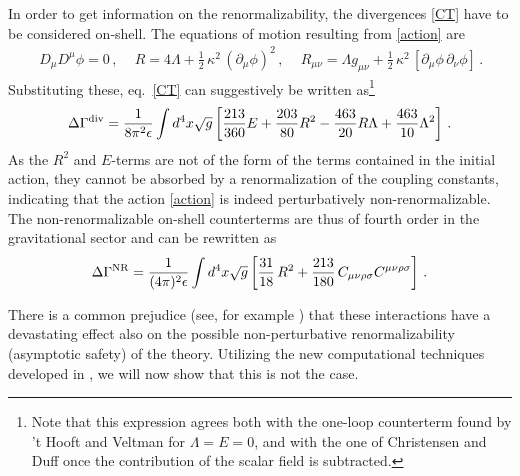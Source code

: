 \documentclass[preprint,preprintnumbers,amsmath,amssymb,nofootinbib,APS]{revtex4}
\newcommand{\be}{\begin{equation}}
\newcommand{\ee}{\end{equation}}
\let\G=\Gamma \let\D=\Delta  \let\Th=\Theta \let\L=\Lambda \let\X=\Xi
\newcommand{\2}{\sqrt{2\,}}
\newcommand{\half}{\tfrac{1}{2}}
\newcommand{\p}{\partial}
\begin{document}
In order to get information on the renormalizability, the divergences \eqref{CT} have to be considered on-shell. 
The equations of motion resulting from \eqref{action} are
%
\be\label{eom}
\begin{split}
 \,D_\mu D^\mu \phi  = 0 \, , \quad
 \,R  = 4 \Lambda + \half \,\kappa^2 \,(\p_\mu \phi)^2 \, , \quad
 \,R_{\mu \nu}  = \Lambda g_{\mu\nu} + \half \,\kappa^2 \, \left[ \p_\mu \phi \, \p_\nu \phi \right] \, .
\end{split}
\ee
%
Substituting these, eq.\ \eqref{CT} can suggestively be written as\footnote{Note that this expression agrees both with the one-loop counterterm found by 't Hooft and Veltman \cite{'tHooft:1974bx} for $\L=E=0$, and with the one of Christensen and Duff \cite{Christensen:1979iy}
once the contribution of the scalar field is subtracted.}
%
\be\label{OSC}
\Delta\G^{\rm div} = \frac{1}{8 \pi^2 \eps} \int d^4x \sqrt{g} \left[ \frac{213}{360} E +\frac{203}{80} R^2-\frac{463}{20} R \Lambda +\frac{463}{10}\Lambda^2 \right] \, .
\ee
%
% 
As the $R^2$ and $E$-terms are not of the form of the terms contained in the initial action, they cannot be absorbed by a renormalization of the coupling constants, indicating that the action \eqref{action} is indeed perturbatively non-renormalizable. The non-renormalizable on-shell counterterms are thus of fourth order in the gravitational sector and can be rewritten as
%
\be\label{NR}
\Delta \Gamma^{\rm NR} = \frac{1}{(4 \pi)^2 \eps} \int d^4x \sqrt{g} \left[ \frac{31}{18} \, R^2 + \frac{213}{180} \, C_{\mu\nu\rho \sigma} C^{\mu\nu\rho \sigma} \right] \, .
\ee
%

There is a common prejudice (see, for example \cite{Jacques}) that these interactions have a devastating effect also on the possible non-perturbative renormalizability (asymptotic safety) of the theory. Utilizing the new computational techniques developed in \cite{us1}, we will now show that this is not the case.

\end{document}
